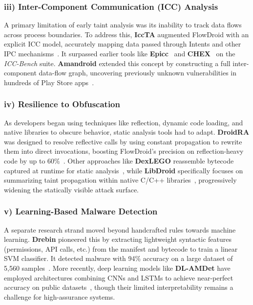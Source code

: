 \documentclass[a4paper,12pt]{report}
\begin{document}
\subsubsection{iii) Inter-Component Communication (ICC) Analysis}
A primary limitation of early taint analysis was its inability to track data flows across process boundaries. To address this, \textbf{IccTA} augmented FlowDroid with an explicit ICC model, accurately mapping data passed through Intents and other IPC mechanisms~\cite{li2015iccta}. It surpassed earlier tools like \textbf{Epicc}~\cite{octeau2013epicc} and \textbf{CHEX}~\cite{lu2012chex} on the \emph{ICC-Bench} suite. \textbf{Amandroid} extended this concept by constructing a full inter-component data-flow graph, uncovering previously unknown vulnerabilities in hundreds of Play Store apps~\cite{wei2014amandroid}.

\subsubsection{iv) Resilience to Obfuscation}
As developers began using techniques like reflection, dynamic code loading, and native libraries to obscure behavior, static analysis tools had to adapt. \textbf{DroidRA} was designed to resolve reflective calls by using constant propagation to rewrite them into direct invocations, boosting FlowDroid’s precision on reflection-heavy code by up to 60\%~\cite{li2016droidra}. Other approaches like \textbf{DexLEGO} reassemble bytecode captured at runtime for static analysis~\cite{ning2019dexlego}, while \textbf{LibDroid} specifically focuses on summarizing taint propagation within native C/C++ libraries~\cite{libdroid2022}, progressively widening the statically visible attack surface.

\subsubsection{v) Learning-Based Malware Detection}
A separate research strand moved beyond handcrafted rules towards machine learning. \textbf{Drebin} pioneered this by extracting lightweight syntactic features (permissions, API calls, etc.) from the manifest and bytecode to train a linear SVM classifier. It detected malware with 94\% accuracy on a large dataset of 5,560 samples~\cite{arp2014drebin}. More recently, deep learning models like \textbf{DL-AMDet} have employed architectures combining CNNs and LSTMs to achieve near-perfect accuracy on public datasets~\cite{nasser2023dlamdet}, though their limited interpretability remains a challenge for high-assurance systems.
\end{document}
